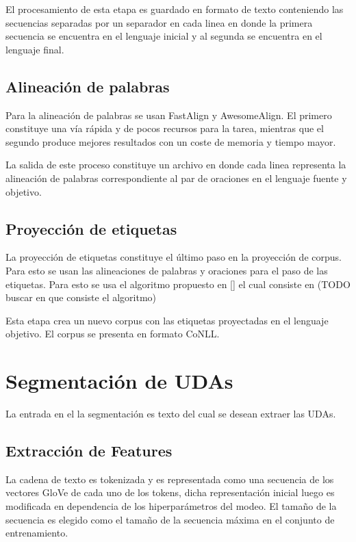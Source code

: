 El procesamiento de esta etapa es guardado en formato de texto conteniendo las 
secuencias separadas por un separador en cada linea en donde la primera secuencia se
encuentra en el lenguaje inicial y al segunda se encuentra en el lenguaje final.

\subsection{Alineación de palabras}

Para la alineación de palabras se usan FastAlign y AwesomeAlign. El primero constituye
una vía rápida y de pocos recursos para la tarea, mientras que el segundo produce mejores
resultados con un coste de memoria y tiempo mayor.

La salida de este proceso constituye un archivo en donde cada linea representa la 
alineación de palabras correspondiente al par de oraciones en el lenguaje fuente y objetivo. 

\subsection{Proyección de etiquetas}

La proyección de etiquetas constituye el último paso en la proyección de corpus. Para esto
se usan las alineaciones de palabras y oraciones para el paso de las etiquetas. Para esto
se usa el algoritmo propuesto en [\cite{eger2018cross}] el cual consiste en (TODO buscar en
que consiste el algoritmo)

Esta etapa crea un nuevo corpus con las etiquetas proyectadas en el lenguaje objetivo. El 
corpus se presenta en formato CoNLL.

\section{Segmentación de UDAs}

La entrada en el la segmentación es texto del cual se desean extraer las UDAs.

\subsection{Extracción de Features}

La cadena de texto es tokenizada y es representada como una secuencia 
de los vectores GloVe de cada uno de los tokens, dicha representación inicial 
luego es modificada en dependencia de los hiperparámetros del modeo. 
El tamaño de la secuencia es elegido como el tamaño de la secuencia máxima en el 
conjunto de entrenamiento.

